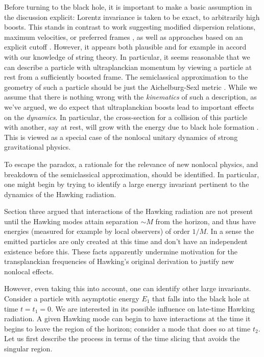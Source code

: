 Before turning to the black hole, it is important to make a basic assumption in the discussion explicit:
Lorentz invariance is taken to be exact, to arbitrarily high boosts.  This stands in contrast to work suggesting modified dispersion relations, maximum velocities, or preferred frames , as well as approaches based on an explicit cutoff .  However, it appears both plausible and for example in accord with our knowledge of string theory.  In particular, it seems reasonable that we can describe a particle with ultraplanckian momentum by viewing a particle at rest from a sufficiently boosted frame.  The semiclassical approximation to the geometry of such a particle should be just the Aichelburg-Sexl metric .
While we assume that there is nothing wrong with the {\it kinematics} of such a description, as we've argued, we do expect that ultraplanckian boosts lead to important effects on the
 {\it dynamics}. In particular, the cross-section for a collision of this particle with another, say at rest, will grow with the energy due to black hole formation .   This is viewed as a special case of the nonlocal unitary dynamics of strong gravitational physics.




To escape the paradox,  a rationale for the relevance of new nonlocal physics, and breakdown of the semiclassical approximation, should  be identified.  In particular, one might begin by trying to identify a large energy invariant pertinent to the dynamics of the Hawking radiation.

Section three argued that interactions of the Hawking radiation are not present until the Hawking modes attain separation $\sim M$ from the horizon, and thus have energies (measured for example by local observers) of order $1/M$.   In a sense the emitted particles are only created at this time and don't have an independent existence before this.
These facts apparently undermine  motivation for the transplanckian frequencies of Hawking's original derivation to justify new nonlocal effects.


However, even taking this into account, one can  identify other large invariants.  Consider a particle with asymptotic energy $E_1$ that falls into the black hole at time $t=t_1=0$.  We are interested in its possible influence on late-time Hawking radiation.    A given Hawking mode can begin to have interactions at the time it begins to leave the region of the horizon; consider a mode that does so at time $t_2$.  Let us first describe the process in terms of the time slicing that avoids the singular region.

